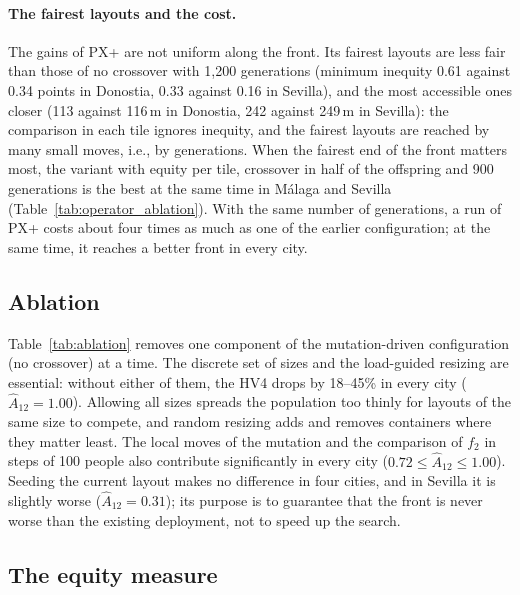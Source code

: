 \paragraph{The fairest layouts and the cost.} The gains of PX+ are not uniform along the front. Its fairest layouts are less fair than those of no crossover with 1,200 generations (minimum inequity 0.61 against 0.34 points in Donostia, 0.33 against 0.16 in Sevilla), and the most accessible ones closer (113 against 116\,m in Donostia, 242 against 249\,m in Sevilla): the comparison in each tile ignores inequity, and the fairest layouts are reached by many small moves, i.e., by generations. When the fairest end of the front matters most, the variant with equity per tile, crossover in half of the offspring and 900 generations is the best at the same time in Málaga and Sevilla (Table~\ref{tab:operator_ablation}). With the same number of generations, a run of PX+ costs about four times as much as one of the earlier configuration; at the same time, it reaches a better front in every city.

\subsection{Ablation}
\label{sec:ablation}


Table~\ref{tab:ablation} removes one component of the mutation-driven configuration (no crossover) at a time. The discrete set of sizes and the load-guided resizing are essential: without either of them, the HV4 drops by 18--45\% in every city ($\hat{A}_{12} = 1.00$). Allowing all sizes spreads the population too thinly for layouts of the same size to compete, and random resizing adds and removes containers where they matter least. The local moves of the mutation and the comparison of $f_2$ in steps of 100 people also contribute significantly in every city ($0.72 \leq \hat{A}_{12} \leq 1.00$). Seeding the current layout makes no difference in four cities, and in Sevilla it is slightly worse ($\hat{A}_{12} = 0.31$); its purpose is to guarantee that the front is never worse than the existing deployment, not to speed up the search.

\subsection{The equity measure}
\label{sec:equity_results}


